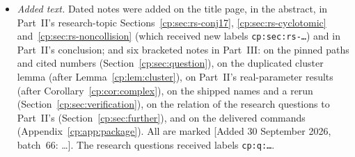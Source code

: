 \documentclass[11pt]{article}
\theoremstyle{definition}
\theoremstyle{remark}
\newcommand{\Z}{\mathbb Z}
\newcommand{\N}{\mathbb N}
\newcommand{\C}{\mathbb C}
\newcommand{\QQ}{\mathscr Q}
\newcommand{\GG}{\mathscr G}
\newcommand{\rep}[2]{(#1)^{[#2]}}
\theoremstyle{definition}
\theoremstyle{plain}
\numberwithin{equation}{section}
\begin{document}
\begin{itemize}
$\Z$, $\N$, $\C$ are replaced by the report's, with the same glyphs. Three
glyphs change: the manuscript's calligraphic $\mathcal Q$ (reduced
denominators) and $\mathcal G$ (generating function) are printed as Part~II's
script $\QQ$ and $\GG$, which denote the same kinds of object; and the
report's repetition macro prints $\rep xr$ with parentheses where the
manuscript printed $x^{[r]}$. Its bibliography entry for Parts~I and~II is
replaced by internal references; its entries for Cigler's paper and for
Gonz\'alez-Serrano--Maximenko are merged with Part~II's (the same papers;
the manuscript adds the page range 2613--2647 of the latter), and
Krattenthaler's survey and Chern--Shi's paper are added. A layout-only
\verb|\Needspace| before Theorem~\ref{cp:thm:main} is dropped. No
normalization is changed. Symbols that mean different things in Part~III
and the earlier parts are listed in Section~\ref{cp:sec:notation}.
\item \emph{Added text.} Dated notes were added on the title page, in the
abstract, in Part~II's research-topic Sections~\ref{cp:sec:rs-conj17},
\ref{cp:sec:rs-cyclotomic} and~\ref{cp:sec:rs-noncollision} (which received
new labels \texttt{cp:sec:rs-\dots}) and in Part~II's conclusion; and six
bracketed notes in Part~III: on the pinned paths and cited numbers
(Section~\ref{cp:sec:question}), on the duplicated cluster lemma (after
Lemma~\ref{cp:lem:cluster}), on Part~II's real-parameter results (after
Corollary~\ref{cp:cor:complex}), on the shipped names and a rerun
(Section~\ref{cp:sec:verification}), on the relation of the research
questions to Part~II's (Section~\ref{cp:sec:further}), and on the delivered
commands (Appendix~\ref{cp:app:package}). All are marked
\textup{[Added 30 September 2026, batch~66: \dots]}. The research questions
received labels \texttt{cp:q:\dots}.
\end{itemize}
\end{document}
